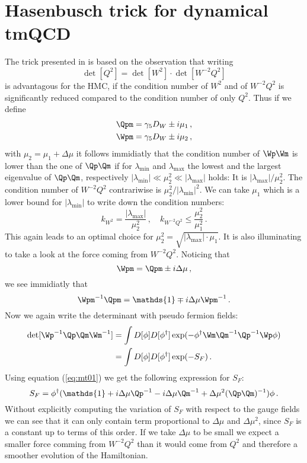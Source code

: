 \section{Hasenbusch trick for dynamical tmQCD}

The trick presented in \cite{Hasenbusch:2002ai} is based on the
observation that writing
\[
\det[Q^2] = \det[W^2]\cdot\det[W^{-2}Q^2]
\]
is advantagous for the HMC, if the condition number of $W^{2}$ and of
$W^{-2}Q^{2}$ is significantly reduced compared to the condition number
of only $Q^2$. Thus if we define
\[
\begin{split}
  \Qpm = \gamma_5 D_W \pm i\mu_1\, ,\\
  \Wpm = \gamma_5 D_W \pm i\mu_2\, ,\\
\end{split}
\]
with $\mu_2 =\mu_1+\Delta\mu$ it follows immidiatly that the condition number of
$\Wp\Wm$ is lower than the one of $\Qp\Qm$ if for $\lambda_{\textrm{min}}$
and $\lambda_{\textrm{max}}$ the lowest and the largest eigenvalue of
$\Qp\Qm$, respectively $|\lambda_{\textrm{min}}|\ll\mu_2^2\ll|\lambda_{\textrm{max}}|$
holds: It is $|\lambda_{\textrm{max}}|/\mu_2^2$. The condition number of
$W^{-2}Q^{2}$ contrariwise is $\mu_2^2/|\lambda_{\textrm{min}}|^2$. We can take
$\mu_1$ which is a lower bound for $|\lambda_{\textrm{min}}|$ to write down
the condition numbers:
\[
k_{W^2} = \frac{|\lambda_{\textrm{max}}|}{\mu_2^2}\, ,\quad
k_{W^{-2}Q^{2}} \leq \frac{\mu_2^2}{\mu_1^2}\, .
\]
This again leads to an optimal choice for
$\mu_2^2=\sqrt{|\lambda_{\textrm{max}}|\cdot\mu_1}$. It is also illuminating to take
a look at the force coming from $W^{-2}Q^{2}$. Noticing that
\[
\Wpm = \Qpm \pm i\Delta\mu\, ,
\]
we see immidiatly that
\begin{equation}
  \label{eq:mt01}
  \Wpm^{-1}\Qpm = \mathds{1} \mp i\Delta\mu\Wpm^{-1}\, .
\end{equation}
Now we again write the determinant with pseudo fermion
fields:
\[
\begin{split}
  \det[\Wp^{-1}\Qp\Qm\Wm^{-1}] &= \int D[\phi]D[\phi^\dagger]
  \exp(-\phi^\dagger\Wm\Qm^{-1}\Qp^{-1}\Wp\phi) \\
  &=  \int D[\phi]D[\phi^\dagger] \exp(-S_F)\, .
\end{split}
\]
Using equation (\ref{eq:mt01}) we get the following expression for
$S_F$:
\begin{equation}
  \label{eq:mt02}
  S_F = \phi^\dagger(\mathds{1} +i\Delta\mu\Qp^{-1}
  -i\Delta\mu\Qm^{-1}+\Delta\mu^2(\Qp\Qm)^{-1}) \phi\, .
\end{equation}
Without explicitly computing the variation of $S_F$ with respect to
the gauge fields we can see that it can only contain term proportional
to $\Delta\mu$ and $\Delta\mu^2$, since $S_F$ is a constant up to terms of this
order. If we take $\Delta\mu$ to be small we expect a smaller force comming
from $W^{-2}Q^{2}$ than it would come from $Q^2$ and therefore a
smoother evolution of the Hamiltonian.


